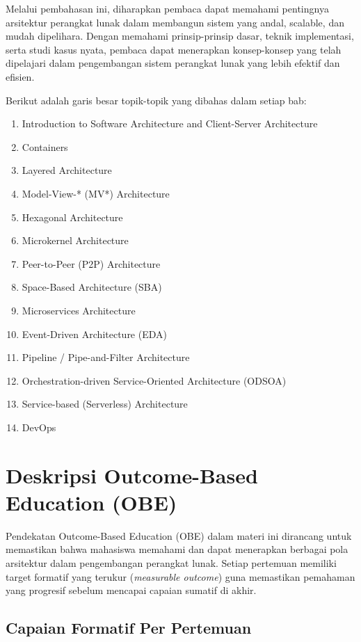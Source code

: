 Melalui pembahasan ini, diharapkan pembaca dapat memahami pentingnya arsitektur perangkat lunak dalam membangun sistem yang andal, scalable, dan mudah dipelihara. Dengan memahami prinsip-prinsip dasar, teknik implementasi, serta studi kasus nyata, pembaca dapat menerapkan konsep-konsep yang telah dipelajari dalam pengembangan sistem perangkat lunak yang lebih efektif dan efisien.

Berikut adalah garis besar topik-topik yang dibahas dalam setiap bab:
\begin{enumerate}
\item Introduction to Software Architecture and Client-Server Architecture
\item Containers
\item Layered Architecture
\item Model-View-* (MV*) Architecture
\item Hexagonal Architecture
\item Microkernel Architecture
\item Peer-to-Peer (P2P) Architecture
\item Space-Based Architecture (SBA)
\item Microservices Architecture
\item Event-Driven Architecture (EDA)
\item Pipeline / Pipe-and-Filter Architecture
\item Orchestration-driven Service-Oriented Architecture (ODSOA)
\item Service-based (Serverless) Architecture
\item DevOps
\end{enumerate}


\section{Deskripsi Outcome-Based Education (OBE)}

Pendekatan Outcome-Based Education (OBE) dalam materi ini dirancang untuk memastikan bahwa mahasiswa memahami dan dapat menerapkan berbagai pola arsitektur dalam pengembangan perangkat lunak. Setiap pertemuan memiliki target formatif yang terukur (\textit{measurable outcome}) guna memastikan pemahaman yang progresif sebelum mencapai capaian sumatif di akhir.

\subsection{Capaian Formatif Per Pertemuan}

